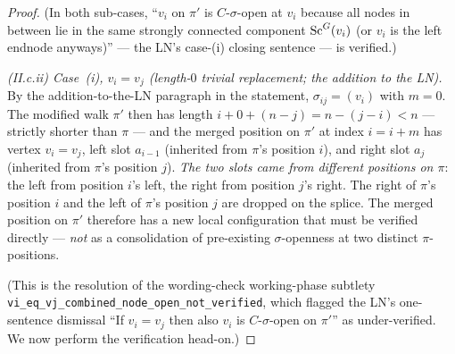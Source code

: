 \begin{Lem}[LabelRoman]
\begin{proof}
(In both sub-cases, ``$v_i$ on $\pi'$ is $C$-$\sigma$-open at $v_i$ because all nodes in between lie in the same strongly connected component $\mathrm{Sc}^G(v_i)$ (or $v_i$ is the left endnode anyways)'' — the LN's case-(i) closing sentence — is verified.)

\smallskip\noindent\emph{(II.c.ii) Case~(i), $v_i = v_j$ (length-$0$ trivial replacement; the addition to the LN).}
By the addition-to-the-LN paragraph in the statement, $\sigma_{ij} = (v_i)$ with $m = 0$. The modified walk $\pi'$ then has length $i + 0 + (n - j) = n - (j - i) < n$ — strictly shorter than $\pi$ — and the merged position on $\pi'$ at index $i = i + m$ has vertex $v_i = v_j$, left slot $a_{i-1}$ (inherited from $\pi$'s position $i$), and right slot $a_j$ (inherited from $\pi$'s position $j$). \emph{The two slots came from different positions on $\pi$}: the left from position $i$'s left, the right from position $j$'s right. The right of $\pi$'s position $i$ and the left of $\pi$'s position $j$ are dropped on the splice. The merged position on $\pi'$ therefore has a new local configuration that must be verified directly — \emph{not} as a consolidation of pre-existing $\sigma$-openness at two distinct $\pi$-positions.

(This is the resolution of the wording-check working-phase subtlety \texttt{vi\_eq\_vj\_combined\_node\_open\_not\_verified}, which flagged the LN's one-sentence dismissal ``If $v_i = v_j$ then also $v_i$ is $C$-$\sigma$-open on $\pi'$'' as under-verified. We now perform the verification head-on.)


\end{proof}
\end{Lem}
